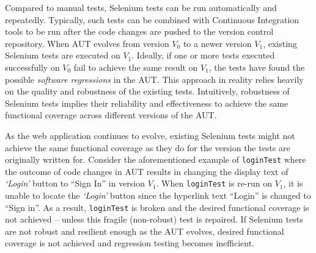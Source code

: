 
  

Compared to manual tests, Selenium tests can be run automatically and repeatedly. Typically, such tests can be combined with Continuous Integration tools to be run after the code changes are pushed to the version control repository. When AUT evolves from version $V_{0}$ to a newer version $V_{1}$, existing Selenium tests are executed on $V_{1}$. Ideally, if one or more tests executed successfully on $V_{0}$ fail to achieve the same result on $V_{1}$, the tests have found the possible \textit{software regressions} in the AUT. This approach in reality relies heavily on the quality and robustness of the existing tests. Intuitively, robustness of Selenium tests implies their reliability and effectiveness to achieve the same functional coverage across different versions of the AUT. 


As the web application continues to evolve, existing Selenium tests might not achieve the same functional coverage as they do for the version the tests are originally written for. Consider the aforementioned example of \texttt{loginTest} where the outcome of code changes in AUT results in changing the display text of \textit{`Login'} button to ``Sign In'' in version $V_{1}$. When \texttt{loginTest} is re-run on $V_{1}$, it is unable to locate the \textit{`Login'} button since the hyperlink text ``Login'' is changed to ``Sign in''. As a result, \texttt{loginTest} is broken and the desired functional coverage is not achieved -- unless this fragile (non-robust) test is repaired. If Selenium tests are not robust and resilient enough as the AUT evolves, desired functional coverage is not achieved and regression testing becomes inefficient.


